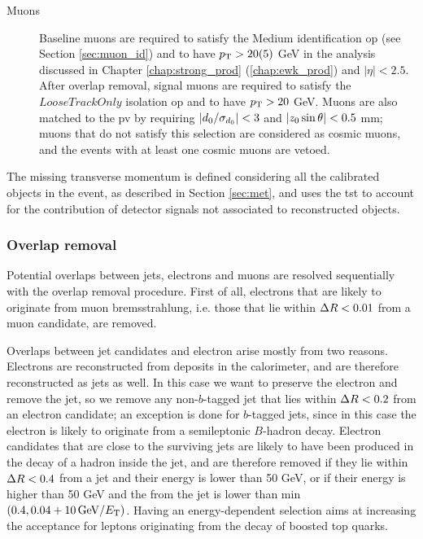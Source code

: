 \begin{description}
\item[Muons] Baseline muons are required to satisfy the Medium identification \gls{op} (see Section \ref{sec:muon_id}) and to have $p_{\rm T} > 20 (5)$ GeV in the analysis discussed in Chapter \ref{chap:strong_prod} (\ref{chap:ewk_prod}) and $|\eta|<2.5$. 
After overlap removal, signal muons are required to satisfy the $LooseTrackOnly$ isolation \gls{op} and to have $p_{\rm T} > 20$ GeV.
Muons are also matched to the \gls{pv} by requiring $|{d_0}/\sigma_{d_0}| < 3$ and  $|{z_0} \sin\theta| < 0.5$ mm; muons that do not satisfy this selection are considered as cosmic muons, and the events with at least one cosmic muons are vetoed.

\end{description}

The missing transverse momentum is defined considering all the calibrated objects in the event, as described in Section \ref{sec:met}, and uses the \gls{tst} to account for the contribution of
detector signals not associated to reconstructed objects. 

\subsubsection*{Overlap removal}

Potential overlaps between jets, electrons and muons are resolved sequentially with the overlap removal procedure. 
First of all, electrons that are likely to originate from muon bremsstrahlung, i.e. those that lie within $\Delta R < 0.01$ from a muon candidate, are removed.

Overlaps between jet candidates and electron arise mostly from two reasons. Electrons are reconstructed from deposits in the calorimeter, and are therefore reconstructed as jets as well.
In this case we want to preserve the electron and remove the jet, so we remove any non-$b$-tagged jet that lies within $\Delta R < 0.2$ from an electron candidate;
an exception is done for $b$-tagged jets, since in this case the electron is likely to originate from a semileptonic $B$-hadron decay. 
Electron candidates that are close to the surviving jets are likely to have been produced in the decay of a hadron inside the jet, and are therefore removed
if they lie within $\Delta R<0.4$ from a jet and their energy is lower than 50 GeV, or if their energy is higher than 50 GeV and the \dR from the jet 
is lower than min$(0.4, 0.04 + 10 \, {\rm{GeV}}/E_{\rm{T}})$. 
Having an energy-dependent \dR selection aims at increasing the acceptance for leptons originating from the decay of boosted top quarks.


